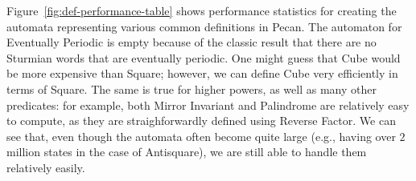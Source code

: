 Figure~\ref{fig:def-performance-table} shows performance statistics for creating the automata representing various common definitions in Pecan.
The automaton for Eventually Periodic is empty because of the classic result that there are no Sturmian words that are eventually periodic.
One might guess that Cube would be more expensive than Square; however, we can define Cube very efficiently in terms of Square.
The same is true for higher powers, as well as many other predicates: for example, both Mirror Invariant and Palindrome are relatively easy to compute, as they are straighforwardly defined using Reverse Factor.
We can see that, even though the automata often become quite large (e.g., having over $2$ million states in the case of Antisquare), we are still able to handle them relatively easily.

